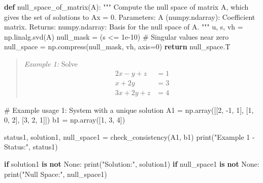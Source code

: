 \documentclass[
  letterpaper,
  DIV=11,
  numbers=noendperiod]{scrreprt}
\newenvironment{Shaded}{\begin{snugshade}}{\end{snugshade}}
\newcommand{\BuiltInTok}[1]{\textcolor[rgb]{0.00,0.23,0.31}{#1}}
\newcommand{\CommentTok}[1]{\textcolor[rgb]{0.37,0.37,0.37}{#1}}
\newcommand{\ControlFlowTok}[1]{\textcolor[rgb]{0.00,0.23,0.31}{\textbf{#1}}}
\newcommand{\DecValTok}[1]{\textcolor[rgb]{0.68,0.00,0.00}{#1}}
\newcommand{\FloatTok}[1]{\textcolor[rgb]{0.68,0.00,0.00}{#1}}
\newcommand{\KeywordTok}[1]{\textcolor[rgb]{0.00,0.23,0.31}{\textbf{#1}}}
\newcommand{\NormalTok}[1]{\textcolor[rgb]{0.00,0.23,0.31}{#1}}
\newcommand{\OperatorTok}[1]{\textcolor[rgb]{0.37,0.37,0.37}{#1}}
\newcommand{\StringTok}[1]{\textcolor[rgb]{0.13,0.47,0.30}{#1}}
\newcommand{\VariableTok}[1]{\textcolor[rgb]{0.07,0.07,0.07}{#1}}
\theoremstyle{plain}
\theoremstyle{definition}
\theoremstyle{remark}
\begin{document}
\begin{Shaded}
\begin{Highlighting}[]
\KeywordTok{def}\NormalTok{ null\_space\_of\_matrix(A):}
    \CommentTok{"""}
\CommentTok{    Compute the null space of matrix A, which gives the set of solutions to Ax = 0.}
\CommentTok{    }
\CommentTok{    Parameters:}
\CommentTok{    A (numpy.ndarray): Coefficient matrix.}
\CommentTok{    }
\CommentTok{    Returns:}
\CommentTok{    numpy.ndarray: Basis for the null space of A.}
\CommentTok{    """}
\NormalTok{    u, s, vh }\OperatorTok{=}\NormalTok{ np.linalg.svd(A)}
\NormalTok{    null\_mask }\OperatorTok{=}\NormalTok{ (s }\OperatorTok{\textless{}=} \FloatTok{1e{-}10}\NormalTok{)  }\CommentTok{\# Singular values near zero}
\NormalTok{    null\_space }\OperatorTok{=}\NormalTok{ np.compress(null\_mask, vh, axis}\OperatorTok{=}\DecValTok{0}\NormalTok{)}
    \ControlFlowTok{return}\NormalTok{ null\_space.T}
\end{Highlighting}
\end{Shaded}

\begin{quote}
\emph{Example 1:} Solve
\begin{align*}2x-y+z&=1\\ x+2y&=3\\ 3x+2y+z&=4\end{align*}
\end{quote}

\begin{Shaded}
\begin{Highlighting}[]
\CommentTok{\# Example usage 1: System with a unique solution}
\NormalTok{A1 }\OperatorTok{=}\NormalTok{ np.array([[}\DecValTok{2}\NormalTok{, }\OperatorTok{{-}}\DecValTok{1}\NormalTok{, }\DecValTok{1}\NormalTok{], [}\DecValTok{1}\NormalTok{, }\DecValTok{0}\NormalTok{, }\DecValTok{2}\NormalTok{], [}\DecValTok{3}\NormalTok{, }\DecValTok{2}\NormalTok{, }\DecValTok{1}\NormalTok{]])}
\NormalTok{b1 }\OperatorTok{=}\NormalTok{ np.array([}\DecValTok{1}\NormalTok{, }\DecValTok{3}\NormalTok{, }\DecValTok{4}\NormalTok{])}

\NormalTok{status1, solution1, null\_space1 }\OperatorTok{=}\NormalTok{ check\_consistency(A1, b1)}
\BuiltInTok{print}\NormalTok{(}\StringTok{"Example 1 {-} Status:"}\NormalTok{, status1)}

\ControlFlowTok{if}\NormalTok{ solution1 }\KeywordTok{is} \KeywordTok{not} \VariableTok{None}\NormalTok{:}
    \BuiltInTok{print}\NormalTok{(}\StringTok{"Solution:"}\NormalTok{, solution1)}
\ControlFlowTok{if}\NormalTok{ null\_space1 }\KeywordTok{is} \KeywordTok{not} \VariableTok{None}\NormalTok{:}
    \BuiltInTok{print}\NormalTok{(}\StringTok{"Null Space:"}\NormalTok{, null\_space1)}
\end{Highlighting}
\end{Shaded}
\end{document}
